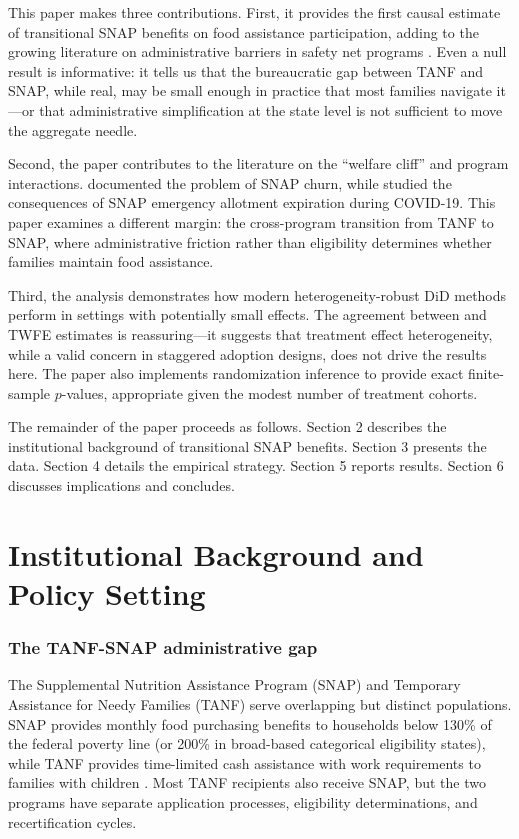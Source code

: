 \documentclass[12pt]{article}
\begin{document}
This paper makes three contributions. First, it provides the first causal estimate of transitional SNAP benefits on food assistance participation, adding to the growing literature on administrative barriers in safety net programs \citep{currie2006take, finkelstein2019take, homonoff2021does}. Even a null result is informative: it tells us that the bureaucratic gap between TANF and SNAP, while real, may be small enough in practice that most families navigate it---or that administrative simplification at the state level is not sufficient to move the aggregate needle.

Second, the paper contributes to the literature on the ``welfare cliff'' and program interactions. \citet{ziliak2015temporary} documented the problem of SNAP churn, while \citet{gray2023expiration} studied the consequences of SNAP emergency allotment expiration during COVID-19. This paper examines a different margin: the cross-program transition from TANF to SNAP, where administrative friction rather than eligibility determines whether families maintain food assistance.

Third, the analysis demonstrates how modern heterogeneity-robust DiD methods perform in settings with potentially small effects. The agreement between \citet{callaway2021difference} and TWFE estimates is reassuring---it suggests that treatment effect heterogeneity, while a valid concern in staggered adoption designs, does not drive the results here. The paper also implements randomization inference \citep{fisher1935design, hess2017randomization} to provide exact finite-sample $p$-values, appropriate given the modest number of treatment cohorts.

The remainder of the paper proceeds as follows. Section 2 describes the institutional background of transitional SNAP benefits. Section 3 presents the data. Section 4 details the empirical strategy. Section 5 reports results. Section 6 discusses implications and concludes.


\section{Institutional Background and Policy Setting}

\subsubsection*{The TANF-SNAP administrative gap} The Supplemental Nutrition Assistance Program (SNAP) and Temporary Assistance for Needy Families (TANF) serve overlapping but distinct populations. SNAP provides monthly food purchasing benefits to households below 130\% of the federal poverty line (or 200\% in broad-based categorical eligibility states), while TANF provides time-limited cash assistance with work requirements to families with children \citep{falk2022tanf}. Most TANF recipients also receive SNAP, but the two programs have separate application processes, eligibility determinations, and recertification cycles.
\end{document}
